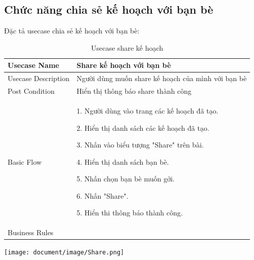 \subsection{Chức năng chia sẻ kế hoạch với bạn bè}
Đặc tả usecase chia sẻ kế hoạch với bạn bè: 
\begin{table}[H]
    \centering
	\begin{tabular}{|p{5cm}|p{10cm}|}
    
    \hline
    Usecase Name&Share kế hoạch với bạn bè\\
    \hline
    Usecase Description&Người dùng muốn share kế hoạch của mình với bạn bè\\
    \hline
    Post Condition&Hiển thị thông báo share thành công \\
    \hline
    Basic Flow& 1. Người dùng vào trang các kế hoạch đã tạo.
    
    2. Hiển thị danh sách các kế hoạch đã tạo.
    
    3. Nhấn vào biểu tượng "Share" trên bài.
    
    4. Hiển thị danh sách bạn bè.
    
    5. Nhấn chọn bạn bè muốn gởi.
    
    6. Nhấn "Share".
    
    5. Hiển thi thông báo thành công.\\
    

    \hline Business Rules& \\
   
   
	\hline
\end{tabular}
\caption{Usecase share kế hoạch}
\end{table}
 \begin{center}
  \captionsetup{type=figure}
  \texttt{[image: document/image/Share.png]}
\end{center}
 

